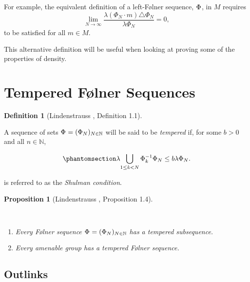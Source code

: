 \documentclass[
  british,
]{article}
\providecommand{\tightlist}{%
  \setlength{\itemsep}{0pt}\setlength{\parskip}{0pt}}
\theoremstyle{plain}
\newtheorem{proposition}{Proposition}[section]
\theoremstyle{definition}
\newtheorem{definition}{Definition}[section]
\theoremstyle{remark}
\newcommand{\Folner}[1][\vphantom{}]{{\Phi}_{#1}}
\newcommand{\CountingMeasure}{{\lambda}}
\newcommand{\Monoid}{{M}}
\newcommand{\MonoidOperation}[2]{{#1}\cdot{#2}}
\newcommand{\MonoidElement}{{m}}
\begin{document}
For example, the equivalent definition of a left-Følner sequence,
\(\Folner\), in \(\Monoid\) requires
\[\lim_{N\rightarrow\infty}\frac{\CountingMeasure{(\MonoidOperation{\Folner[N]}{\MonoidElement})\triangle\Folner[N]}}{\CountingMeasure{\Folner[N]}}=0, \]
to be satisfied for all \(\MonoidElement\in\Monoid\).

This alternative definition will be useful when looking at proving some
of the properties of density.

\section{Tempered Følner Sequences}\label{tempered-fuxf8lner-sequences}

\begin{definition}[Lindenstrauss
, Definition
1.1]\protect\hypertarget{def-tempered}{}\label{def-tempered}

A sequence of sets \(\Folner=(\Folner[N])_{N\in\mathbb{N}}\) will be
said to be \emph{tempered} if, for some \(b>0\) and all
\(n\in\mathbb{N}\),

\begin{equation}\phantomsection\label{eq-ShulmanCondition}{
\CountingMeasure{\bigcup_{1\leq k<N}\Folner[k]^{-1}\Folner[N]}\leq b\CountingMeasure{\Folner[N]}.
}\end{equation}

is referred to as the \emph{Shulman condition}.

\end{definition}

\begin{proposition}[Lindenstrauss
, Proposition
1.4]\protect\hypertarget{prp-temperedFolner}{}\label{prp-temperedFolner}

~

\begin{enumerate}
\def\labelenumi{\arabic{enumi}.}
\tightlist
\item
  Every Følner sequence \(\Folner=(\Folner[N])_{N\in\mathbb{N}}\) has a
  tempered subsequence.
\item
  Every amenable group has a tempered Følner sequence.
\end{enumerate}

\end{proposition}

\subsection*{Outlinks}\label{sec-Outlinks}
\end{document}
